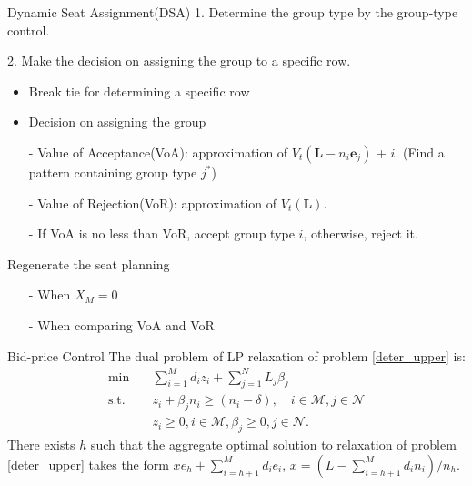     \begin{frame}{Dynamic Seat Assignment(DSA)}
      1. Determine the group type by the group-type control.

      2. Make the decision on assigning the group to a specific row.
      \begin{itemize}
        \item Break tie for determining a specific row
        \item Decision on assigning the group
        \item[-] Value of Acceptance(VoA): approximation of $V_{t} (\mathbf{L}-n_i \mathbf{e}_{j})$ + $i$. (Find a pattern containing group type $j^{*}$)
        
        \item[-] Value of Rejection(VoR): approximation of $V_{t} (\mathbf{L})$.

        \item[-] If VoA is no less than VoR, accept group type $i$, otherwise, reject it.
      \end{itemize}
      Regenerate the seat planning
      \begin{itemize}
      \item[-] When $X_{M} =0$
      \item[-] When comparing VoA and VoR 
      \end{itemize}
    \end{frame}

      \begin{frame}{Bid-price Control}
        The dual problem of LP relaxation of problem \eqref{deter_upper} is:
        \begin{equation}\label{bid-price_dual}
          \begin{aligned}
          \min \quad & \sum_{i=1}^{M} d_i z_i + \sum_{j= 1}^{N} L_j \beta_{j} \\
          \text {s.t.} \quad & z_{i} + \beta_j n_i \geq (n_i-\delta), \quad i \in \mathcal{M}, j \in \mathcal{N} \\
          & z_{i} \geq 0, i \in \mathcal{M}, \beta_{j} \geq 0, j \in \mathcal{N}.
          \end{aligned}
        \end{equation}
        \small There exists $h$ such that the aggregate optimal solution to relaxation of problem \eqref{deter_upper} takes the form $x e_{h} + \sum_{i=h+1} ^{M} d_{i} e_{i}$, $x = (L- \sum_{i = h+1}^{M} {d_i n_i})/ n_h$.

      \end{frame}

